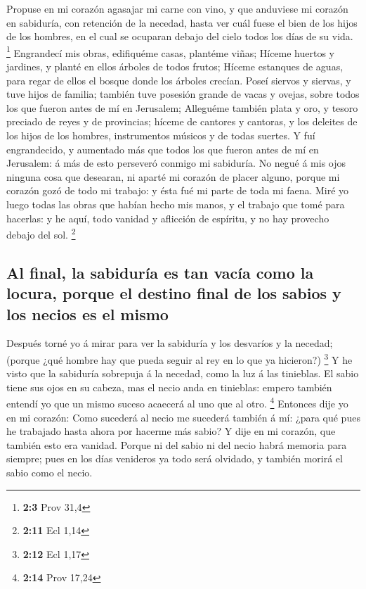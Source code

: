  Propuse en mi corazón agasajar mi carne con vino, y que
anduviese mi corazón en sabiduría, con retención de la necedad, hasta
ver cuál fuese el bien de los hijos de los hombres, en el cual se
ocuparan debajo del cielo todos los días de su vida. \footnote{\textbf{2:3}
  Prov 31,4}  Engrandecí mis obras, edifiquéme casas,
plantéme viñas;  Híceme huertos y jardines, y planté en
ellos árboles de todos frutos;  Híceme estanques de aguas,
para regar de ellos el bosque donde los árboles crecían. 
Poseí siervos y siervas, y tuve hijos de familia; también tuve posesión
grande de vacas y ovejas, sobre todos los que fueron antes de mí en
Jerusalem;  Alleguéme también plata y oro, y tesoro preciado
de reyes y de provincias; híceme de cantores y cantoras, y los deleites
de los hijos de los hombres, instrumentos músicos y de todas suertes.
 Y fuí engrandecido, y aumentado más que todos los que
fueron antes de mí en Jerusalem: á más de esto perseveró conmigo mi
sabiduría.  No negué á mis ojos ninguna cosa que desearan,
ni aparté mi corazón de placer alguno, porque mi corazón gozó de todo mi
trabajo: y ésta fué mi parte de toda mi faena.  Miré yo
luego todas las obras que habían hecho mis manos, y el trabajo que tomé
para hacerlas: y he aquí, todo vanidad y aflicción de espíritu, y no hay
provecho debajo del sol. \footnote{\textbf{2:11} Ecl 1,14}

\hypertarget{al-final-la-sabiduruxeda-es-tan-vacuxeda-como-la-locura-porque-el-destino-final-de-los-sabios-y-los-necios-es-el-mismo}{%
\subsection{Al final, la sabiduría es tan vacía como la locura, porque
el destino final de los sabios y los necios es el
mismo}\label{al-final-la-sabiduruxeda-es-tan-vacuxeda-como-la-locura-porque-el-destino-final-de-los-sabios-y-los-necios-es-el-mismo}}

 Después torné yo á mirar para ver la sabiduría y los
desvaríos y la necedad; (porque ¿qué hombre hay que pueda seguir al rey
en lo que ya hicieron?) \footnote{\textbf{2:12} Ecl 1,17} 
Y he visto que la sabiduría sobrepuja á la necedad, como la luz á las
tinieblas.  El sabio tiene sus ojos en su cabeza, mas el
necio anda en tinieblas: empero también entendí yo que un mismo suceso
acaecerá al uno que al otro. \footnote{\textbf{2:14} Prov 17,24}
 Entonces dije yo en mi corazón: Como sucederá al necio me
sucederá también á mí: ¿para qué pues he trabajado hasta ahora por
hacerme más sabio? Y dije en mi corazón, que también esto era vanidad.
 Porque ni del sabio ni del necio habrá memoria para
siempre; pues en los días venideros ya todo será olvidado, y también
morirá el sabio como el necio.

